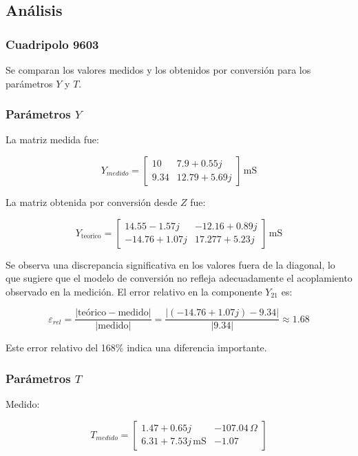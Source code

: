 \subsection{Análisis}


\subsubsection{Cuadripolo 9603}

Se comparan los valores medidos y los obtenidos por conversión para los parámetros $Y$ y $T$.

\subsubsection*{Parámetros $Y$}

La matriz medida fue:


\[
Y_{medido} =
\begin{bmatrix}
10 & 7.9 + 0.55j \\
9.34 & 12.79 + 5.69j
\end{bmatrix} \,\mathrm{mS}
\]



La matriz obtenida por conversión desde $Z$ fue:


\[
Y_{\mathrm{teorico}} =
\begin{bmatrix}
14.55 - 1.57j & -12.16 + 0.89j \\
-14.76 + 1.07j & 17.277 + 5.23j
\end{bmatrix} \,\mathrm{mS}
\]



Se observa una discrepancia significativa en los valores fuera de la diagonal, lo que sugiere que el modelo de conversión no refleja adecuadamente el acoplamiento observado en la medición. El error relativo en la componente $Y_{21}$ es:



\[
\varepsilon_{rel} = \frac{|\text{teórico} - \text{medido}|}{|\text{medido}|} = \frac{|(-14.76 + 1.07j) - 9.34|}{|9.34|} \approx 1.68
\]



Este error relativo del 168\% indica una diferencia importante.

\subsubsection*{Parámetros $T$}

Medido:


\[
T_{medido} =
\begin{bmatrix}
1.47 + 0.65j & -107.04\,\Omega \\
6.31 + 7.53j\,\mathrm{mS} & -1.07
\end{bmatrix}
\]



